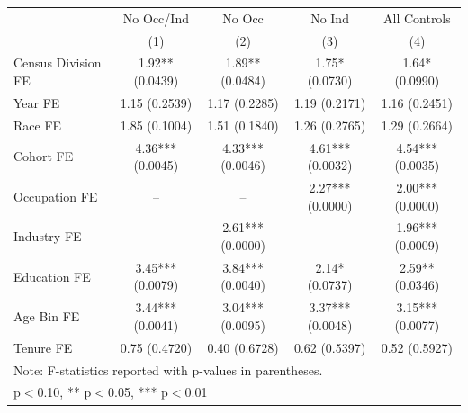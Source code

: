 \begin{tabular}{lcccc}
\hline\hline
 & No Occ/Ind & No Occ & No Ind & All Controls \\
 & (1) & (2) & (3) & (4) \\
\hline
Census Division FE&1.92** (0.0439)&1.89** (0.0484)&1.75* (0.0730)&1.64* (0.0990)\\
Year FE&1.15 (0.2539)&1.17 (0.2285)&1.19 (0.2171)&1.16 (0.2451)\\
Race FE&1.85 (0.1004)&1.51 (0.1840)&1.26 (0.2765)&1.29 (0.2664)\\
Cohort FE&4.36*** (0.0045)&4.33*** (0.0046)&4.61*** (0.0032)&4.54*** (0.0035)\\
Occupation FE&--&--&2.27*** (0.0000)&2.00*** (0.0000)\\
Industry FE&--&2.61*** (0.0000)&--&1.96*** (0.0009)\\
Education FE&3.45*** (0.0079)&3.84*** (0.0040)&2.14* (0.0737)&2.59** (0.0346)\\
Age Bin FE&3.44*** (0.0041)&3.04*** (0.0095)&3.37*** (0.0048)&3.15*** (0.0077)\\
Tenure FE&0.75 (0.4720)&0.40 (0.6728)&0.62 (0.5397)&0.52 (0.5927)\\
\hline
\multicolumn{5}{l}{\footnotesize Note: F-statistics reported with p-values in parentheses.} \\
\multicolumn{5}{l}{\footnotesize * p$<$0.10, ** p$<$0.05, *** p$<$0.01} \\
\hline\hline
\end{tabular}
